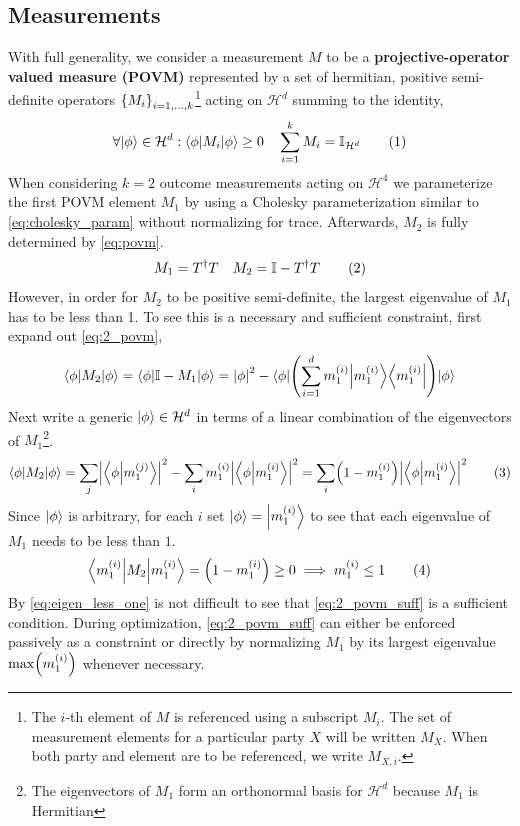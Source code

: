 \documentclass[aps, 10pt, english, twoside, pra, nofootinbib, longbibliography]{revtex4-1}
\theoremstyle{plain}
\theoremstyle{definition}
\theoremstyle{remark}
\newcommand{\Hilb}{\mathcal{H}}
\newcommand{\term}[1]{\textcolor{Mahogany}{\textbf{#1}}}
\begin{document}
    \subsection{Measurements}
    With full generality, we consider a measurement $M$ to be a \term{projective-operator valued measure (POVM)} represented by a set of hermitian, positive semi-definite operators $\bc{M_i}_{i=1,\ldots,k}$\footnote{The $i$-th element of $M$ is referenced using a subscript $M_i$. The set of measurement elements for a particular party $X$ will be written $M_X$. When both party and element are to be referenced, we write $M_{X,i}$.} acting on $\Hilb^d$ summing to the identity,
    \[ \forall \ket{\phi} \in \Hilb^d : \bra{\phi} M_i \ket{\phi} \geq 0 \quad \sum_{i=1}^{k} M_i = \mathbb{I}_{\Hilb^d} \eq \label{eq:povm} \]
    When considering $k=2$ outcome measurements acting on $\Hilb^4$ we parameterize the first POVM element $M_1$ by using a Cholesky parameterization similar to \cref{eq:cholesky_param} without normalizing for trace. Afterwards, $M_2$ is fully determined by \cref{eq:povm}.
    \[ M_1 = T^\dagger T \quad M_2 = \mathbb{I} - T^\dagger T \eq \label{eq:2_povm}\]
    However, in order for $M_2$ to be positive semi-definite, the largest eigenvalue of $M_1$ has to be less than 1. To see this is a necessary and sufficient constraint, first expand out \cref{eq:2_povm},
    \[ \bramidket{\phi}{M_2}{\phi} = \bramidket{\phi}{\mathbb{I} - M_1}{\phi} = \abs{\phi}^2 - \bra{\phi}\br{\sum_{i=1}^{d}m^{\br{i}}_1 \ket{m^{\br{i}}_1}\bra{m^{\br{i}}_1}}\ket{\phi} \]
    Next write a generic $\ket{\phi} \in \Hilb^d$ in terms of a linear combination of the eigenvectors of $M_1$\footnote{The eigenvectors of $M_1$ form an orthonormal basis for $\Hilb^d$ because $M_1$ is Hermitian}.
    \[ \bramidket{\phi}{M_2}{\phi} = \sum_{j}\abs{\braket{\phi}{m^{\br{j}}_1}}^2 - \sum_{i} m^{\br{i}}_1 \abs{\braket{\phi}{m^{\br{i}}_1}}^2 = \sum_{i} \br{1 - m^{\br{i}}_1} \abs{\braket{\phi}{m^{\br{i}}_1}}^2 \eq \label{eq:eigen_less_one} \]
    Since $\ket{\phi}$ is arbitrary, for each $i$ set $\ket{\phi} = \ket{m^{\br{i}}_1}$ to see that each eigenvalue of $M_1$ needs to be less than $1$.
    \[ \bramidket{m^{\br{i}}_1}{M_2}{m^{\br{i}}_1} = \br{1 - m^{\br{i}}_1} \geq 0 \implies m^{\br{i}}_1 \leq 1 \eq \label{eq:2_povm_suff} \]
    By \cref{eq:eigen_less_one} is not difficult to see that \cref{eq:2_povm_suff} is a sufficient condition. During optimization, \cref{eq:2_povm_suff} can either be enforced passively as a constraint or directly by normalizing $M_1$ by its largest eigenvalue $\max\br{m_1^{\br{i}}}$ whenever necessary.
\end{document}
